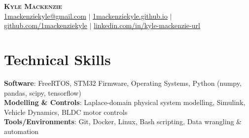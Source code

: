 \documentclass[letterpaper,11pt]{article}
\begin{document}

\begin{center}
\vspace*{-1.0cm}
    \textbf{\Huge \scshape Kyle Mackenzie} \\ \vspace{1pt}
    \href{mailto:1mackenziekyle@gmail.com}{\underline{1mackenziekyle@gmail.com}} $|$
    \small \href{https://1mackenziekyle.github.io}{\underline{1mackenziekyle.github.io}} $|$
    \small \href{https://github.com/1mackenziekyle}{\underline{github.com/1mackenziekyle}} $|$
    \href{https://www.linkedin.com/in/kyle-mackenzie-url/}{\underline{linkedin.com/in/kyle-mackenzie-url}}  
    
    
\end{center}

 
  
%
\section{Technical Skills}

 \begin{itemize}[leftmargin=0.15in, label={}]
    \small{\item{
     \textbf{Software}{: FreeRTOS, STM32 Firmware, Operating Systems, Python (numpy, pandas, scipy, tensorflow) }\\
     \textbf{Modelling \& Controls}{: Laplace-domain physical system modelling, Simulink, Vehicle Dynamics, BLDC motor controls} \\
     \textbf{Tools/Environments}{: Git, Docker, Linux, Bash scripting, Data wrangling \& automation} \\
    }}
 \end{itemize}

\vspace{-7mm}


\vspace{3mm}

\end{document}
